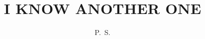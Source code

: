 


\raggedbottom
\LARGE



\title{I KNOW ANOTHER ONE}
\author[PENGK SYLVESTER]{P.~S.}
\publisher{}
\maketitle





      


